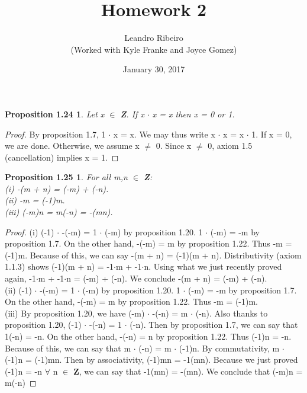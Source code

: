 \documentclass[12pt]{amsart}
\begin{document}
\title{Homework 2}
\date{January 30, 2017}
\author{Leandro Ribeiro\\(Worked with Kyle Franke and Joyce Gomez)}

\maketitle

\theoremstyle{plain}
\newtheorem*{prop1.24}{Proposition 1.24}
\begin{prop1.24}
	Let x $\in$ \textbf{Z}. If x $\cdot$ x = x then x = 0 or 1.
\end{prop1.24}

\begin{proof}
	By proposition 1.7, 1 $\cdot$ x = x. We may thus write x $\cdot$ x = x $\cdot$ 1. If x = 0, we are done. Otherwise, we assume x $\neq$ 0. Since x $\neq$ 0, axiom 1.5 (cancellation) implies x = 1.
\end{proof}

\newtheorem*{prop1.25}{Proposition 1.25}
\begin{prop1.25}
	For all m,n $\in$ \textbf{Z}:
	\\(i) -(m + n) = (-m) + (-n).
	\\(ii) -m = (-1)m.
	\\(iii)	(-m)n = m(-n) = -(mn).
\end{prop1.25}

\begin{proof}
	(i) (-1) $\cdot$ -(-m) = 1 $\cdot$ (-m)  by proposition 1.20. 1 $\cdot$ (-m) = -m by proposition 1.7. On the other hand, -(-m) = m by proposition 1.22. Thus -m = (-1)m. Because of this, we can say -(m + n) = (-1)(m + n). Distributivity (axiom 1.1.3) shows (-1)(m + n) = -1$\cdot$m + -1$\cdot$n. Using what we just recently proved again, -1$\cdot$m + -1$\cdot$n = (-m) + (-n). We conclude -(m + n) = (-m) + (-n).
	\\
	\indent(ii) (-1) $\cdot$ -(-m) = 1 $\cdot$ (-m) by proposition 1.20. 1 $\cdot$ (-m) = -m by proposition 1.7. On the other hand, -(-m) = m by proposition 1.22. Thus -m = (-1)m.
	\\
	\indent(iii) By proposition 1.20, we have (-m) $\cdot$ -(-n) = m $\cdot$ (-n). Also thanks to proposition 1.20, (-1) $\cdot$ -(-n) = 1 $\cdot$ (-n). Then by proposition 1.7, we can say that 1(-n) = -n. On the other hand, -(-n) = n by proposition 1.22. Thus (-1)n = -n. Because of this, we can say that m $\cdot$ (-n) = m $\cdot$ (-1)n. By commutativity, m $\cdot$ (-1)n = (-1)mn. Then by associativity, (-1)mn = -1(mn). Because we just proved (-1)n = -n $\forall$ n $\in$ \textbf{Z}, we can say that -1(mn) = -(mn). We conclude that (-m)n = m(-n)
\end{proof}
\end{document}
